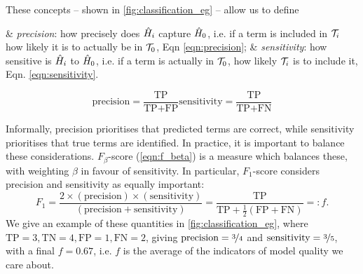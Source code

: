\par 

\noindent These concepts -- shown in \cref{fig:classification_eg} -- allow us to define 

\begin{easylist}
    & \emph{precision}: how precisely does $\hat{H}_i$ capture $\hat{H}_0$,
    i.e. if a term is included in ${ \mathcal{T}_i }$ how likely it is to actually be in ${ \mathcal{T}_0 }$, Eqn \ref{eqn:precision};
    & \emph{sensitivity}: how sensitive is $\hat{H}_i$ to $\hat{H}_0$, 
    i.e. if a term is actually in ${ \mathcal{T}_0 }$, how likely ${ \mathcal{T}_i }$ is to include it, Eqn. \ref{eqn:sensitivity}.
\end{easylist}

\begin{subequations}
    \begin{equation}
        \label{eqn:precision}
        \text{precision} = \frac{\textrm{TP}}{\textrm{TP} + \textrm{FP}}
    \end{equation}
       
    \begin{equation}
        \label{eqn:sensitivity}
        \text{sensitivity} = \frac{\textrm{TP}}{\textrm{TP} + \textrm{FN}}
    \end{equation}
\end{subequations}

Informally, precision prioritises that predicted terms are correct, 
    while sensitivity prioritises that true terms are identified. 
In practice, it is important to balance these considerations. 
$F_{\beta}$-score (\cref{eqn:f_beta}) is a measure which balances these,
    with weighting $\beta$ in favour of sensitivity.
In particular, $F_1$-score considers precision and sensitivity as equally important:
\begin{equation}
    \label{eqn:f1_score}
    F_1 = \frac{
        2\times (\textrm{precision})\times(\textrm{sensitivity})
    }{
        (\textrm{precision} + \textrm{sensitivity})
    } = \frac{\textrm{TP}}{\textrm{TP} + \frac{1}{2}(\textrm{FP} + \textrm{FN})} =: f.
\end{equation}
We give an example of these quantities in \cref{fig:classification_eg}, 
    where $\textrm{TP}=3, \textrm{TN}=4, \textrm{FP}=1, \textrm{FN}=2$, giving $\textrm{precision} = \nicefrac{3}{4}$ 
    and $\textrm{sensitivity} = \nicefrac{3}{5}$, 
    with a final $f = 0.67$, i.e. $f$ is the average of the indicators of model quality we care about. 
\par 

